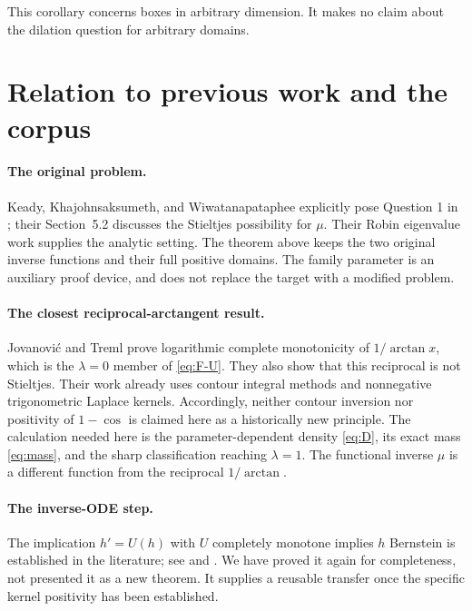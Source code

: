 \documentclass[11pt,a4paper]{article}
\theoremstyle{definition}\newtheorem{definition}[theorem]{Definition}
\theoremstyle{remark}\newtheorem{remark}[theorem]{Remark}
\begin{document}
This corollary concerns boxes in arbitrary dimension. It makes no
claim about the dilation question for arbitrary domains.

\section{Relation to previous work and the corpus}\label{sec:literature}

\paragraph{The original problem.}
Keady, Khajohnsaksumeth, and Wiwatanapataphee explicitly pose
Question 1 in \cite[p.~2]{KKW2018}; their Section~5.2 discusses the
Stieltjes possibility for $\mu$. Their Robin eigenvalue work
\cite{KW2017} supplies the analytic setting. The theorem above
keeps the two original inverse functions and their full positive
domains. The family parameter is an auxiliary proof device, and
does not replace the target with a modified problem.

\paragraph{The closest reciprocal-arctangent result.}
Jovanovi\'c and Treml \cite{JT2021} prove logarithmic complete
monotonicity of $1/\arctan x$, which is the $\lambda=0$ member of
\eqref{eq:F-U}. They also show that this reciprocal is not
Stieltjes. Their work already uses contour integral methods and
nonnegative trigonometric Laplace kernels. Accordingly, neither
contour inversion nor positivity of $1-\cos$ is claimed here as
a historically new principle. The calculation needed here is the
parameter-dependent density \eqref{eq:D}, its exact mass
\eqref{eq:mass}, and the sharp classification reaching
$\lambda=1$. The functional inverse $\mu$ is a different
function from the reciprocal $1/\arctan$.

\paragraph{The inverse-ODE step.}
The implication $h'=U(h)$ with $U$ completely monotone implies
$h$ Bernstein is established in the literature; see
\cite[Lemma~2.6]{Li2026} and \cite[Lemma~2.6]{SalazarBF2026}.
We have proved it again for completeness,
not presented it as a new theorem. It supplies a reusable
transfer once the specific kernel positivity has been established.
\end{document}
